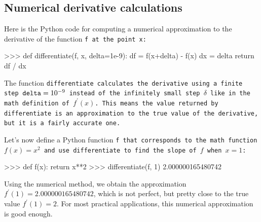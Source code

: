 \vspace{-4mm}	%

	\subsection{Numerical derivative calculations}

		Here is the Python code for computing
		a numerical approximation to the derivative of the function \tt{f} at the point~\tt{x}:

		\begin{codeblock}[]
		>>> def differentiate(f, x, delta=1e-9):
		        df = f(x+delta) - f(x)
		        dx = delta
		        return df / dx
		\end{codeblock}

		\noindent
		The function \tt{differentiate} calculates the derivative using a finite step $\tt{delta} = 10^{-9}$
		instead of the infinitely small step $\delta$
		like in the math definition of $f^{\prime\!}(x)$.
		This means the value returned by \tt{differentiate}
		is an approximation to the true value of the derivative,
		but it is a fairly accurate one.

		Let's now define a Python function \tt{f} that corresponds to the math function $f(x)=x^2$
		and use \tt{differentiate} to find the slope of $f$ when $x=1$:

		\begin{codeblock}[]
		>>> def f(x):
		        return x**2
		>>> differentiate(f, 1)
		2.000000165480742
		\end{codeblock}

		\noindent
		Using the numerical method,
		we obtain the approximation $f^{\prime\!}(1) = 2.000000165480742$,
		which is not perfect,
		but pretty close to the true value $f^{\prime\!}(1) = 2$.
		For most practical applications,
		this numerical approximation is good enough.


